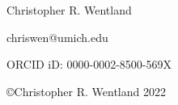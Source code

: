 \thispagestyle{empty}
\begin{center}
    Christopher R. Wentland
    
    chriswen@umich.edu
    
    ORCID iD: 0000-0002-8500-569X
    
    \vspace{1em}
    \copyright Christopher R. Wentland 2022
\end{center}
\restoregeometry